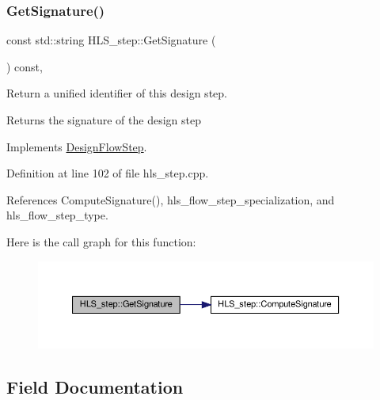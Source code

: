 \subsubsection{\texorpdfstring{Get\+Signature()}{GetSignature()}}
{\footnotesize\ttfamily const std\+::string H\+L\+S\+\_\+step\+::\+Get\+Signature (\begin{DoxyParamCaption}{ }\end{DoxyParamCaption}) const\hspace{0.3cm}{\ttfamily [override]}, {\ttfamily [virtual]}}



Return a unified identifier of this design step. 

\begin{DoxyReturn}{Returns}
the signature of the design step 
\end{DoxyReturn}


Implements \hyperlink{classDesignFlowStep_ab111e3d4058615c2dedc0505978d4699}{Design\+Flow\+Step}.



Definition at line 102 of file hls\+\_\+step.\+cpp.



References Compute\+Signature(), hls\+\_\+flow\+\_\+step\+\_\+specialization, and hls\+\_\+flow\+\_\+step\+\_\+type.

Here is the call graph for this function\+:
\nopagebreak
\begin{figure}[H]
\begin{center}
\leavevmode
\includegraphics[width=350pt]{da/d27/classHLS__step_a93c15724812bc99bccd3c57bcb680295_cgraph}
\end{center}
\end{figure}


\subsection{Field Documentation}
\mbox{\label{classHLS__step_aa9ddc4003e136aca4cf28fb01e23e4b7}} 
